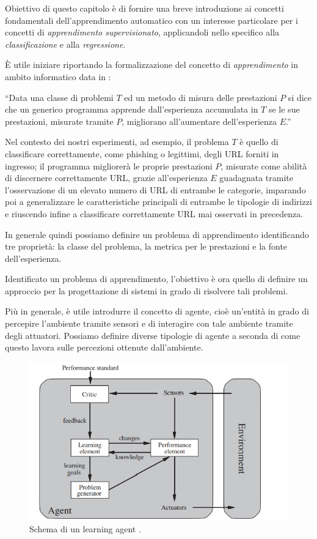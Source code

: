 \documentclass[../../main.tex]{subfiles}
\begin{document}
    Obiettivo di questo capitolo è di fornire una breve introduzione ai concetti fondamentali dell'apprendimento automatico con un interesse particolare per i concetti di \textit{apprendimento supervisionato}, applicandoli nello specifico alla \textit{classificazione} e alla \textit{regressione}.

    È utile iniziare riportando la formalizzazione del concetto di \textit{apprendimento} in ambito informatico data in \cite{Mitchell97}:
    
    ``Data una classe di problemi $T$ ed un metodo di misura delle prestazioni $P$ si dice che un generico programma apprende dall'esperienza accumulata in $T$ se le sue prestazioni, misurate tramite $P$, migliorano all'aumentare dell'esperienza $E$.'' 

    Nel contesto dei nostri esperimenti, ad esempio, il problema $T$ è quello di classificare correttamente, come phishing o legittimi, degli URL forniti in ingresso; il programma migliorerà le proprie prestazioni $P$, misurate come abilità di discernere correttamente URL, grazie all'esperienza  $E$ guadagnata tramite l'osservazione di un elevato numero di URL di entrambe le categorie, imparando poi a generalizzare le caratteristiche principali di entrambe le tipologie di indirizzi e riuscendo infine a classificare correttamente  URL mai osservati in precedenza.

    In generale quindi possiamo definire un problema di apprendimento identificando tre proprietà: la classe del problema, la metrica per le prestazioni e la fonte dell'esperienza.

    Identificato un problema di apprendimento, l'obiettivo è ora quello di definire un approccio per la progettazione di sistemi in grado di risolvere tali problemi.

    Più in generale, è utile introdurre il concetto di agente, cioè un'entità in grado di percepire l'ambiente tramite sensori e di interagire con tale ambiente tramite degli attuatori. Possiamo definire diverse tipologie di agente a seconda di come questo lavora sulle percezioni ottenute dall'ambiente.

    \begin{figure}[H]
        \centering
        \includegraphics[width =\textwidth]{immagini/4_0/learning_agent.png}
        \caption{Schema di un learning agent \cite{russel2010}.}
        \label{fig:learning_agent}
    \end{figure}
\end{document}
